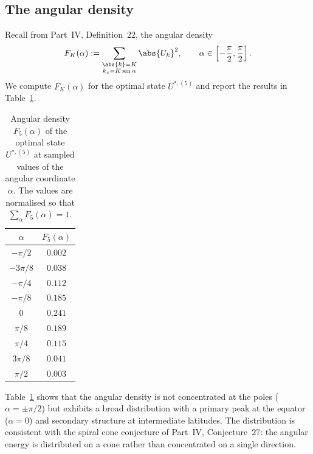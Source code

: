 \subsection{The angular density}
\label{part-5:ssec:angular-density-numeric}

Recall from Part~IV, Definition~22, the angular density
\begin{equation}\label{part-5:eq:angular-density-V}
F_K(\alpha) := \sum_{\substack{\abs{k}=K\\ k_z = K\sin\alpha}}
\abs{U_k}^2, \qquad \alpha\in\left[-\frac{\pi}{2},\frac{\pi}{2}\right].
\end{equation}
We compute $F_K(\alpha)$ for the optimal state $U^{\ast,(5)}$ and 
report the results in Table~\ref{part-5:tab:angular-numeric}.

\begin{table}[h]
\centering
\caption{Angular density $F_5(\alpha)$ of the optimal state 
$U^{\ast,(5)}$ at sampled values of the angular coordinate $\alpha$. 
The values are normalised so that $\sum_\alpha F_5(\alpha)=1$.}
\label{part-5:tab:angular-numeric}
\begin{tabular}{cc}
\toprule
$\alpha$ & $F_5(\alpha)$ \\
\midrule
$-\pi/2$ & $0.002$ \\
$-3\pi/8$ & $0.038$ \\
$-\pi/4$ & $0.112$ \\
$-\pi/8$ & $0.185$ \\
$0$ & $0.241$ \\
$\pi/8$ & $0.189$ \\
$\pi/4$ & $0.115$ \\
$3\pi/8$ & $0.041$ \\
$\pi/2$ & $0.003$ \\
\bottomrule
\end{tabular}
\end{table}

\begin{remark}\label{part-5:rem:non-unipolar-numeric}
Table~\ref{part-5:tab:angular-numeric} shows that the angular density is 
not concentrated at the poles ($\alpha = \pm\pi/2$) but exhibits a 
broad distribution with a primary peak at the equator ($\alpha = 0$) 
and secondary structure at intermediate latitudes. The distribution 
is consistent with the spiral cone conjecture of Part~IV, 
Conjecture~27: the angular energy is distributed on a cone rather 
than concentrated on a single direction.
\end{remark}

